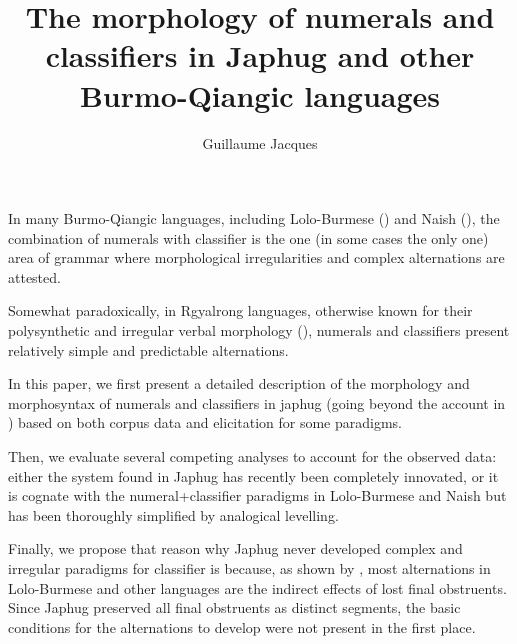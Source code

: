 \documentclass[oldfontcommands,twoside,a4paper,12pt]{article}
\begin{document}
\title{The morphology of numerals and classifiers  in Japhug and other Burmo-Qiangic languages}
\author{Guillaume Jacques}
\maketitle

In many Burmo-Qiangic languages, including Lolo-Burmese (\citealt{bradley05numerals}) and Naish (\citealt{michaud11cl}), the combination of numerals with classifier is the one (in some cases the only one) area of grammar where morphological irregularities and complex alternations are attested.

Somewhat paradoxically, in Rgyalrong languages, otherwise known for their polysynthetic and irregular verbal morphology (\citealt{jacques12incorp}), numerals and classifiers present relatively simple and predictable alternations. 

In this paper, we first present a detailed description of the morphology and morphosyntax of numerals and classifiers in japhug (going beyond the account in   \citealt{jacques08zh}) based on both corpus data and elicitation for some paradigms. 

Then, we evaluate several competing analyses to account for the observed data: either the system found in Japhug has recently been completely innovated, or it is cognate with the numeral+classifier paradigms in Lolo-Burmese and Naish but has been thoroughly simplified by analogical levelling.

Finally, we propose that  reason why Japhug never developed complex and irregular paradigms for classifier is because, as shown by \citet{bradley05numerals}, most alternations in Lolo-Burmese and other languages  are the indirect effects of lost final obstruents. Since Japhug preserved all final obstruents as distinct segments, the basic conditions for the alternations to develop were not present in the first place.


   
 





\end{document}
